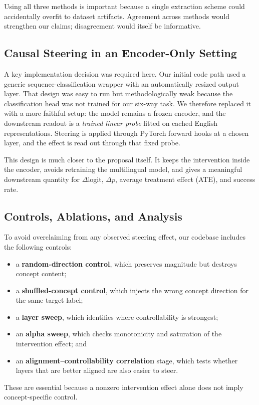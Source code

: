 \documentclass[11pt]{article}
\begin{document}
Using all three methods is important because a single extraction scheme could accidentally overfit to dataset artifacts. Agreement across methods would strengthen our claims; disagreement would itself be informative.

\subsection{Causal Steering in an Encoder-Only Setting}
A key implementation decision was required here. Our initial code path used a generic sequence-classification wrapper with an automatically resized output layer. That design was easy to run but methodologically weak because the classification head was not trained for our six-way task. We therefore replaced it with a more faithful setup: the model remains a frozen encoder, and the downstream readout is a \emph{trained linear probe} fitted on cached English representations. Steering is applied through PyTorch forward hooks at a chosen layer, and the effect is read out through that fixed probe.

This design is much closer to the proposal itself. It keeps the intervention inside the encoder, avoids retraining the multilingual model, and gives a meaningful downstream quantity for $\Delta$logit, $\Delta p$, average treatment effect (ATE), and success rate.

\subsection{Controls, Ablations, and Analysis}
To avoid overclaiming from any observed steering effect, our codebase includes the following controls:
\begin{itemize}[leftmargin=*,itemsep=2pt]
    \item a \textbf{random-direction control}, which preserves magnitude but destroys concept content;
    \item a \textbf{shuffled-concept control}, which injects the wrong concept direction for the same target label;
    \item a \textbf{layer sweep}, which identifies where controllability is strongest;
    \item an \textbf{alpha sweep}, which checks monotonicity and saturation of the intervention effect; and
    \item an \textbf{alignment--controllability correlation} stage, which tests whether layers that are better aligned are also easier to steer.
\end{itemize}
These are essential because a nonzero intervention effect alone does not imply concept-specific control.
\end{document}
